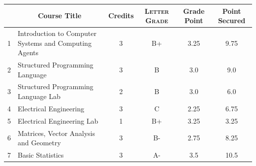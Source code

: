 \documentclass[11pt]{article}
\newcommand*{\numtwo}[1]{\pgfmathprintnumber[
                    fixed, precision=2, fixed zerofill=true]{#1}}
\begin{document}
                \begin{center}
                    \renewcommand{\arraystretch}{1.08}
                    
                \begin{tabular}{|c|l|c|>{\scshape}c|c|c|}
                \hline  \rule[-1ex]{0pt}{3.5ex} {\centering{\bf Course Code}} &  \multicolumn{1}{c|}{\textbf{Course Title}}  & {\bf Credits} & {\bf Letter Grade} & {\bf Grade Point} & {\bf Point Secured}  \\ 
                \hline   1 &  Introduction to Computer Systems and Computing Agents		 & 3 & B+ & 3.25 & 9.75 \\ %
                \hline   2 &  Structured Programming Language		 & 3 & B & 3.0 & 9.0 \\ %
                \hline   3 &  Structured Programming Language Lab		 & 2 & B & 3.0 & 6.0 \\ %
                \hline   4 &  Electrical Engineering		 & 3 & C & 2.25 & 6.75 \\ %
                \hline   5 &  Electrical Engineering Lab		 & 1 & B+ & 3.25 & 3.25 \\ %
                \hline   6 &  Matrices, Vector Analysis and Geometry		 & 3 & B- & 2.75 & 8.25 \\ %
                \hline   7 &  Basic Statistics		 & 3 & A- & 3.5 & 10.5 \\ %

\hline                %
                \end{tabular}
                \end{center}
                \renewcommand{\arraystretch}{1.03}
\end{document}
